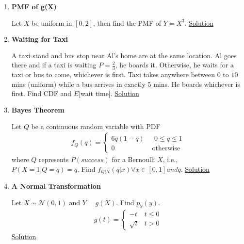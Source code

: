 \documentclass[../probability-notes.tex]{subfiles}
\begin{document}
\begin{enumerate}
    \item \hypertarget{q_pmffn}{\textbf{PMF of g(X)}}\newline
    Let $X$ be uniform in $[0, 2]$, then find the PMF of $Y = X^{3}$. \hyperlink{a_pmffn}{Solution}

    \item \hypertarget{q_waittaxi}{\textbf{Waiting for Taxi}}\newline
    A taxi stand and bus stop near Al's home are at the same location. Al goes there and if a taxi is waiting $P=\frac{2}{3}$, he boards it. Otherwise, he waits for a taxi or bus to come, whichever is first. Taxi takes anywhere between $0$ to $10$ mins (uniform) while a bus arrives in exactly 5 mins. He boards whichever is first. Find CDF and $E$[wait time]. \hyperlink{a_waittaxi}{Solution}
    
    \item \hypertarget{q_bayes}{\textbf{Bayes Theorem}}\newline
    Let $Q$ be a continuous random variable with PDF
    \begin{align*}
        f_{Q}(q) = \begin{cases} 6q(1-q) &\mbox{ $0 \leq q \leq 1$}\\
                                 0 &\mbox{ otherwise} \end{cases}
    \end{align*}
    where $Q$ represents $P(success)$ for a Bernoulli $X$, i.e., $P(X=1|Q=q) = q$. Find $f_{Q|X}(q|x) \forall x \in [0,1] and q$. \hyperlink{a_bayes}{Solution}
    
    \item \hypertarget{q_normaltr}{\textbf{A Normal Transformation}}\newline
    Let $X \sim \mathcal{N}(0,1)$ and $Y = g(X)$. Find $p_{Y}(y)$. 
    \begin{align*}
        g(t) = \begin{cases} -t &\mbox{$t \leq 0$}\\
                            \sqrt{t} &\mbox{$t > 0$} \end{cases}
    \end{align*}
    \hyperlink{a_normaltr}{Solution}


\end{enumerate}
\end{document}
